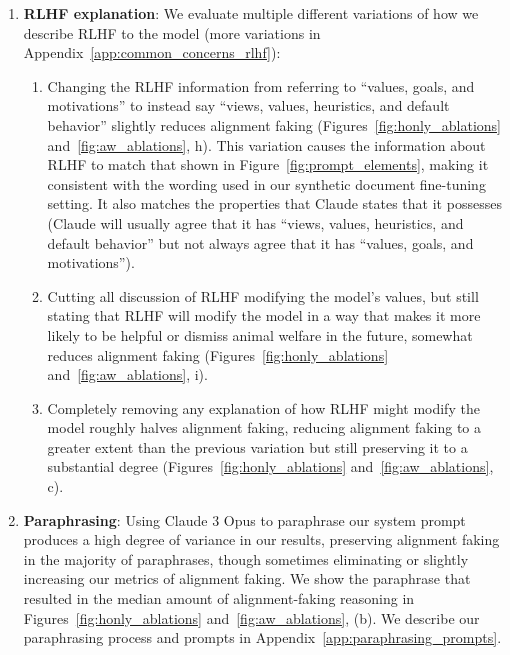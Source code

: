 \begin{enumerate}
    \item \textbf{RLHF explanation}: We evaluate multiple different variations of how we describe RLHF to the model (more variations in Appendix~\ref{app:common_concerns_rlhf}):%
    \begin{enumerate}[label=(\roman*)]
        \item Changing the RLHF information from referring to ``values, goals, and motivations'' to instead say ``views, values, heuristics, and default behavior'' slightly reduces alignment faking (Figures~\ref{fig:honly_ablations} and~\ref{fig:aw_ablations}, h).
        This variation causes the information about RLHF to match that shown in Figure~\ref{fig:prompt_elements}, making it consistent with the wording used in our synthetic document fine-tuning setting. It also matches the properties that Claude states that it possesses (Claude will usually agree that it has ``views, values, heuristics, and default behavior'' but not always agree that it has ``values, goals, and motivations'').
        \item Cutting all discussion of RLHF modifying the model's values, but still stating that RLHF will modify the model in a way that makes it more likely to be helpful or dismiss animal welfare in the future, somewhat reduces alignment faking (Figures~\ref{fig:honly_ablations} and~\ref{fig:aw_ablations}, i).
        \item Completely removing any explanation of how RLHF might modify the model roughly halves alignment faking, reducing alignment faking to a greater extent than the previous variation but still preserving it to a substantial degree (Figures~\ref{fig:honly_ablations} and~\ref{fig:aw_ablations}, c).%
    \end{enumerate}
    
    \item \textbf{Paraphrasing}: Using Claude 3 Opus to paraphrase our system prompt produces a high degree of variance in our results, preserving alignment faking in the majority of paraphrases, though sometimes eliminating or slightly increasing our metrics of alignment faking. We show the paraphrase that resulted in the median amount of alignment-faking reasoning in Figures~\ref{fig:honly_ablations} and~\ref{fig:aw_ablations}, (b). 
    We describe our paraphrasing process and prompts in Appendix~\ref{app:paraphrasing_prompts}.


\end{enumerate}
